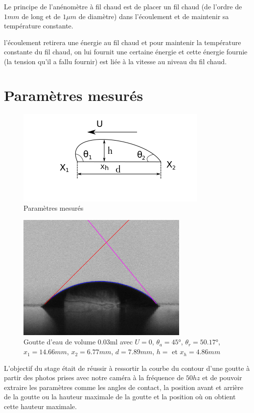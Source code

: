 \documentclass[french]{article}
\begin{document}
Le principe de l'anénomètre à fil chaud est de placer un fil chaud (de l'ordre de $1mm$ de long et de $1\mu m$ de diamètre) dans l'écoulement et de maintenir sa température constante.

l'écoulement retirera une énergie au fil chaud et pour maintenir la température constante du fil chaud, on lui fournit une certaine énergie et cette énergie fournie (la tension qu'il a fallu fournir) est liée à la vitesse au niveau du fil chaud.


\section{Paramètres mesurés}

\begin{figure}[ht]
	\centering
	\includegraphics[scale = 1]{./image/rrgou2.png}
	\caption{Paramètres mesurés}
\end{figure}
\begin{figure}[ht]
	\centering
	\includegraphics[scale = 0.5]{./image/crop_tvitesse=28_volume=003.png}
	\caption{Goutte d'eau de volume $0.03$ml avec $U = 0$, $\theta_{a} = \ang{45}$, $\theta_{r} = \ang{50.17}$, $x_{1} = 14.66mm$, $x_{2} = 6.77mm$, $d = 7.89mm$, $h = $ et $x_{h} = 4.86mm$}
\end{figure}


L'objectif du stage était de réussir à ressortir la courbe du contour d'une goutte à partir des photos prises avec notre caméra à la fréquence de $50hz$ et de pouvoir extraire les paramètres comme les angles de contact, la position avant et arrière de la goutte ou la hauteur maximale de la goutte et la position où on obtient cette hauteur maximale.
\end{document}
